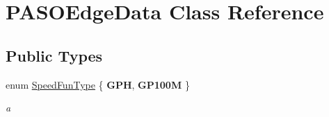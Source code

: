 \hypertarget{class_p_a_s_o_edge_data}{}\section{P\+A\+S\+O\+Edge\+Data Class Reference}
\label{class_p_a_s_o_edge_data}
\subsection*{Public Types}
\begin{DoxyCompactItemize}
\item 
\hypertarget{class_p_a_s_o_edge_data_a30164e651874b10a410d96616c7b4077}{}enum \hyperlink{class_p_a_s_o_edge_data_a30164e651874b10a410d96616c7b4077}{Speed\+Fun\+Type} \{ {\bfseries G\+P\+H}, 
{\bfseries G\+P100\+M}
 \}\label{class_p_a_s_o_edge_data_a30164e651874b10a410d96616c7b4077}

\begin{DoxyCompactList}\small\item\em a \end{DoxyCompactList}\end{DoxyCompactItemize}
